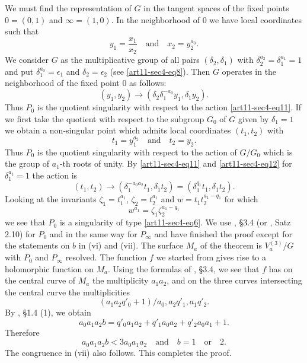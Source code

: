 We must find the representation of $G$ in the tangent spaces of the fixed points $0=(0,1)$ and $\infty=(1,0)$. In the neighborhood of $0$ we have local coordinates such that
\begin{equation}
y_{1}=\dfrac{x_{1}}{x_{2}}\quad\text{and}\quad x_{2}=y^{a_{0}}_{2}.\label{art11-sec4-eq10}
\end{equation}
We consider $G$ as the multiplicative group of all pairs $(\delta_{2},\delta_{1})$ with $\delta^{a_{2}}_{2}=\delta^{a_{1}}_{1}=1$ and put $\delta^{a_{0}}_{1}=\epsilon_{1}$ and $\delta_{2}=\epsilon_{2}$ (see \eqref{art11-sec4-eq8}). Then $G$ operates in the neighborhood of the fixed point $0$ as follows:
\begin{equation}
(y_{1},y_{2})\to (\delta_{2}\delta^{-a_{0}}_{1}y_{1}, \delta_{1}y_{2}).\label{art11-sec4-eq11}
\end{equation}
Thus $P_{0}$ is the quotient singularity with respect to the action \eqref{art11-sec4-eq11}. If we first take the quotient with respect to the subgroup $G_{0}$ of $G$ given by $\delta_{1}=1$ we obtain a non-singular point which admits local coordinates $(t_{1},t_{2})$ with
\begin{equation}
t_{1}=y^{a_{2}}_{1}\quad\text{and}\quad t_{2}=y_{2}.\label{art11-sec4-eq12}
\end{equation}
Thus $P_{0}$ is the quotient singularity with respect to the action of $G/G_{0}$ which is the group of $a_{1}$-th roots of unity. By \eqref{art11-sec4-eq11} and \eqref{art11-sec4-eq12} for $\delta^{a_{1}}_{1}=1$ the action is
\begin{equation}
(t_{1},t_{2})\to (\delta^{-a_{0}a_{2}}_{1}t_{1},\delta_{1}t_{2})=(\delta^{q_{1}}_{1}t_{1},\delta_{1}t_{2}).\label{art11-sec4-eq13}
\end{equation}
Looking at the invariants $\zeta_{1}=t^{a_{1}}_{1}$, $\zeta_{2}=t^{a_{1}}_{2}$ and $w=t_{1}t^{a_{1}-q_{1}}_{2}$ for which
$$
w^{a_{1}}=\zeta_{1}\zeta^{a_{1}-q_{1}}_{2}
$$
we see that $P_{0}$ is a singularity of type \eqref{art11-sec4-eq6}. We use \cite{art11-key6}, \S3.4 (or \cite{art11-key2}, Satz 2.10) for $P_{0}$ and in the same way for $P_{\infty}$ and have finished the proof except for the statements on $b$ in (vi) and (vii). The surface $M_{a}$ of the theorem is $V^{(3)}_{a}/G$ with $P_{0}$ and $P_{\infty}$ resolved. The function $f$ we started from gives rise to a holomorphic function on $M_{a}$. Using the formulas of \cite{art11-key6}, \S3.4, we see that $f$ has on the central curve of $M_{a}$ the multiplicity $a_{1}a_{2}$, and on the three curves intersecting the central curve the multiplicities 
$$
(a_{1}a_{2}q'_{0}+1)/a_{0},a_{2}q'_{1},a_{1}q'_{2}.
$$\pageoriginale
By \cite{art11-key6}, \S1.4 (1), we obtain
$$
a_{0}a_{1}a_{2}b=q'_{0}a_{1}a_{2}+q'_{1}a_{0}a_{2}+q'_{2}a_{0}a_{1}+1.
$$
Therefore
$$
a_{0}a_{1}a_{2}b<3a_{0}a_{1}a_{2}\quad\text{and}\quad b=1\quad\text{or}\quad 2.
$$
The congruence in (vii) also follows. This completes the proof.

